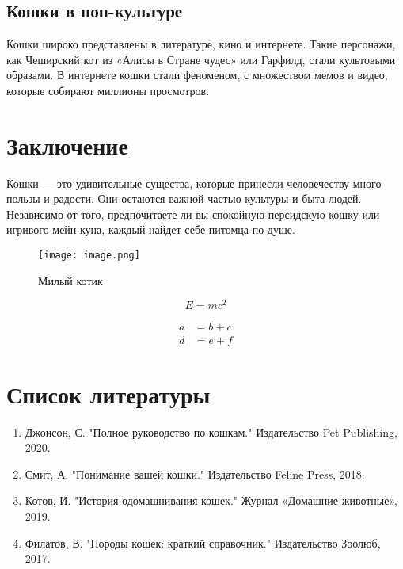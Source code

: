 \documentclass{report}
\begin{document}
\section{Кошки в поп-культуре}
Кошки широко представлены в литературе, кино и интернете. Такие персонажи, как Чеширский кот из «Алисы в Стране чудес» или Гарфилд, стали культовыми образами. В интернете кошки стали феноменом, с множеством мемов и видео, которые собирают миллионы просмотров.

\chapter{Заключение}

Кошки — это удивительные существа, которые принесли человечеству много пользы и радости. Они остаются важной частью культуры и быта людей. Независимо от того, предпочитаете ли вы спокойную персидскую кошку или игривого мейн-куна, каждый найдет себе питомца по душе.

\begin{figure}[h]
    \centering
    \texttt{[image: image.png]}
    \caption{Милый котик}
    \label{fig:example}
\end{figure}

\begin{equation} 
    E = mc^2 
\end{equation} 

\begin{align}\label{eq:myformula}
    a &= b + c \\
    d &= e + f
\end{align}

\chapter{Список литературы}
\begin{enumerate}
\item Джонсон, С. "Полное руководство по кошкам." Издательство Pet Publishing, 2020.
\item Смит, А. "Понимание вашей кошки." Издательство Feline Press, 2018.
\item Котов, И. "История одомашнивания кошек." Журнал «Домашние животные», 2019.
\item Филатов, В. "Породы кошек: краткий справочник." Издательство Зоолюб, 2017.
\end{enumerate}
\end{document}
